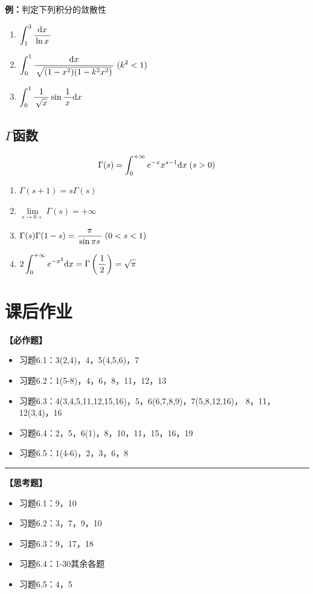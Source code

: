 {\bf 例：}判定下列积分的敛散性
\begin{enumerate}[(1)]
  \setlength{\itemindent}{1cm}
  \item $\displaystyle\int_1^3\displaystyle\frac{\,{\mathrm{d} x}\,}{\,{\ln x}\,}$ 
  \item $\displaystyle\int_0^1\displaystyle\frac{\,{\mathrm{d} x}\,}{\,{\sqrt{(1-x^2)(1-k^2x^2)}}\,}\;(k^2<1)$ 
  \item $\displaystyle\int_0^1\displaystyle\frac{\,{1}\,}{\,{\sqrt{x}}\,}\sin\displaystyle\frac{\,{1}\,}{\,{x}\,}\mathrm{d} x$
\end{enumerate}

\subsection{$\Gamma$函数}

$${\Gamma(s)=\displaystyle\int_0^{+\infty}e^{-x}x^{s-1}\mathrm{d} x\;(s>0)}$$

\begin{enumerate}[(1)]
  \setlength{\itemindent}{1cm}
  \item $\Gamma(s+1)=s\Gamma(s)$ 
  \item $\lim\limits_{s\to 0+}\Gamma(s)= +\infty$ 
  \item $\Gamma(s)\Gamma(1-s)=\displaystyle\frac{\,{\pi}\,}{\,{\sin \pi s}\,}\;(0<s<1)$ 
  \item $2\displaystyle\int_0^{+\infty}e^{-x^2}\mathrm{d} x=\Gamma\left(\displaystyle\frac{\,{1}\,}{\,{2}\,}\right)=\sqrt{\pi}$
\end{enumerate}

\newpage

\section*{课后作业}

{\bf 【必作题】}

\begin{itemize}
  \item 习题6.1：3(2,4)，4，5(4,5,6)，7
  \item 习题6.2：1(5-8)，4，6，8，11，12，13
  \item 习题6.3：4(3,4,5,11,12,15,16)，5，6(6,7,8,9)，7(5,8,12,16)，
  8，11，12(3,4)，16
  \item 习题6.4：2，5，6(1)，8，10，11，15，16，19
  \item 习题6.5：1(4-6)，2，3，6，8
\end{itemize}

\bigskip

\hrule

\bigskip
\bigskip

{\bf 【思考题】}

\begin{itemize}
  \item 习题6.1：9，10
  \item 习题6.2：3，7，9，10
  \item 习题6.3：9，17，18
  \item 习题6.4：1-30其余各题
  \item 习题6.5：4，5
\end{itemize}

